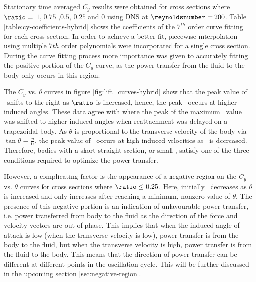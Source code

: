 %


Stationary time averaged $C_y$ results were obtained for cross sections where $\ratio=$ $1$, $0.75$ ,$0.5$, $0.25$ and $0$ using DNS at $\reynoldsnumber=200$. Table \ref{table:cy-coefficients-hybrid} shows the coefficients of the $7^{th}$ order curve fitting for each cross section. In order to achieve a better fit, piecewise interpolation using multiple $7th$ order polynomials were incorporated for a single cross section. During the curve fitting process more importance was given to accurately fitting the positive portion of the $C_{y}$ curve, as the power transfer from the fluid to the body only occurs in this region. 

 

The $C_y$ vs. $\theta$ curves in figure \ref{fig:lift_curves-hybrid} show that the peak value of \cy\ shifts to the right as $\ratio$ is increased, hence, the peak \cy\ occurs at higher induced angles.  These data agree with \citet{Luo1994} where the peak of the maximum \cy\ value was shifted to higher induced angles when reattachment was delayed on a trapezoidal body. As $\theta$ is proportional to the transverse velocity of the body via $\tan{\theta}=\frac{\dot{y}}{U}$, the peak value of \cy\ occurs at high induced velocities as \ratio\ is decreased. Therefore, bodies with a short straight section, or small \ratio, satisfy one of the three conditions required to optimize the power transfer.

However, a complicating factor is the appearance of a negative region on the $C_y$ vs. $\theta$ curves for cross sections where $\ratio\leq0.25$. Here, initially \cy\ decreases as $\theta$ is increased and only increases after reaching a minimum, nonzero value of $\theta$. The presence of this negative portion is an indication of unfavourable power transfer, i.e. power transferred from body to the fluid as the direction of the force and velocity vectors are out of phase. This implies that when the induced angle of attack is low (when the transverse velocity is low), power transfer is from the body to the fluid, but when the transverse velocity is high, power transfer is from the fluid to the body. This means that the direction of power transfer can be different at different points in the oscillation cycle. This will be further discussed in the upcoming section \ref{sec:negative-region}.

